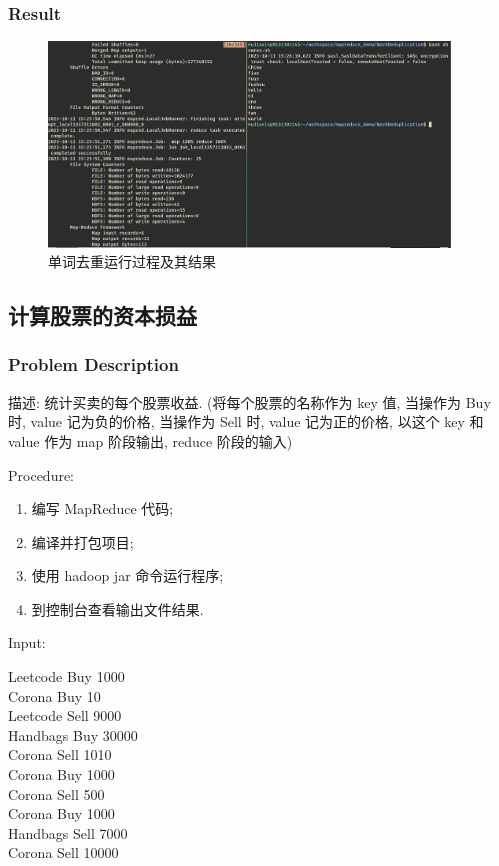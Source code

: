 \documentclass{article}
\begin{document}
    \subsubsection{Result}

    \begin{figure}[H]
      \begin{center}
        \includegraphics[width=0.95\textwidth]{./figures/1.jpg}
      \end{center}
      \caption{单词去重运行过程及其结果}
    \end{figure}


    \subsection{计算股票的资本损益}

    \subsubsection{Problem Description}

    描述: 统计买卖的每个股票收益.
    (将每个股票的名称作为 key 值, 当操作为 Buy 时, value 记为负的价格,
    当操作为 Sell 时, value 记为正的价格,
    以这个 key 和 value 作为 map 阶段输出, reduce 阶段的输入)

    \noindent Procedure:
    \begin{enumerate}
      \item 编写 MapReduce 代码;
      \item 编译并打包项目;
      \item 使用 hadoop jar 命令运行程序;
      \item 到控制台查看输出文件结果.
    \end{enumerate}

    \noindent Input:

    \noindent Leetcode Buy 1000 \\
    Corona Buy 10 \\
    Leetcode Sell 9000 \\
    Handbags Buy 30000 \\
    Corona Sell 1010 \\
    Corona Buy 1000 \\
    Corona Sell 500 \\
    Corona Buy 1000 \\
    Handbags Sell 7000 \\
    Corona Sell 10000
\end{document}
